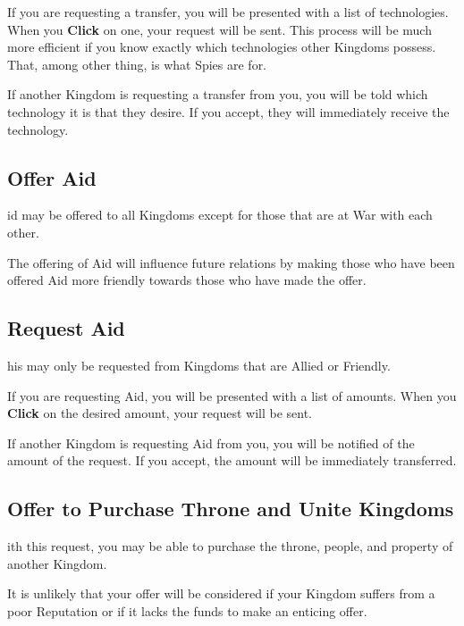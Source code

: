 If you are requesting a transfer, you will be presented with a list of technologies. When you \textbf{Click} on one, your request will be sent. This process will be much more efficient if you know exactly which technologies other Kingdoms possess. That, among other thing, is what Spies are for.

If another Kingdom is requesting a transfer from you, you will be told which technology it is that they desire. If you accept, they will immediately receive the technology.

\subsection{\textsf{Offer Aid}}

id may be offered to all Kingdoms except for those that are at War with each other.

The offering  of Aid will influence future relations by making those who have been offered Aid more friendly towards those who have made the offer.

\subsection{\textsf{Request Aid}}


his may only be requested from Kingdoms that are Allied or Friendly.

If you are requesting Aid, you will be presented with a list of amounts. When you \textbf{Click} on the desired amount, your request will be sent.

If another Kingdom is requesting Aid from you, you will be notified of the amount of the request. If you accept, the amount will be immediately transferred.

\subsection{\textsf{Offer to Purchase Throne and Unite Kingdoms}}


ith this request, you may be able to purchase the throne, people, and property of another Kingdom.

It is unlikely that your offer will be considered if your Kingdom suffers from a poor Reputation or if it lacks the funds to make an enticing offer.

